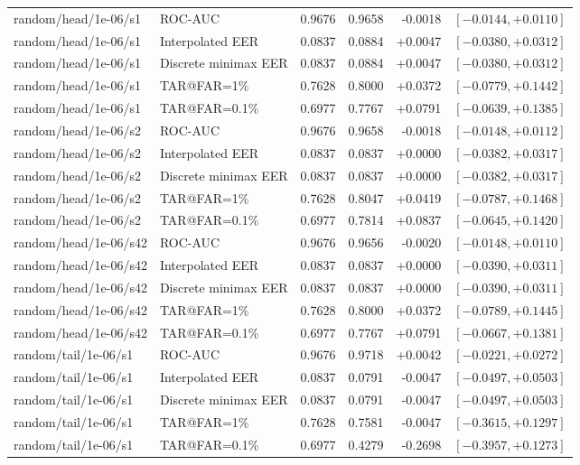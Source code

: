 \begin{table}[!t]
\begin{tabular}{@{}llrrrr@{}}
random/head/1e-06/s1 & ROC-AUC & 0.9676 & 0.9658 & -0.0018 & $[-0.0144,+0.0110]$ \\
random/head/1e-06/s1 & Interpolated EER & 0.0837 & 0.0884 & +0.0047 & $[-0.0380,+0.0312]$ \\
random/head/1e-06/s1 & Discrete minimax EER & 0.0837 & 0.0884 & +0.0047 & $[-0.0380,+0.0312]$ \\
random/head/1e-06/s1 & TAR@FAR=1\% & 0.7628 & 0.8000 & +0.0372 & $[-0.0779,+0.1442]$ \\
random/head/1e-06/s1 & TAR@FAR=0.1\% & 0.6977 & 0.7767 & +0.0791 & $[-0.0639,+0.1385]$ \\
random/head/1e-06/s2 & ROC-AUC & 0.9676 & 0.9658 & -0.0018 & $[-0.0148,+0.0112]$ \\
random/head/1e-06/s2 & Interpolated EER & 0.0837 & 0.0837 & +0.0000 & $[-0.0382,+0.0317]$ \\
random/head/1e-06/s2 & Discrete minimax EER & 0.0837 & 0.0837 & +0.0000 & $[-0.0382,+0.0317]$ \\
random/head/1e-06/s2 & TAR@FAR=1\% & 0.7628 & 0.8047 & +0.0419 & $[-0.0787,+0.1468]$ \\
random/head/1e-06/s2 & TAR@FAR=0.1\% & 0.6977 & 0.7814 & +0.0837 & $[-0.0645,+0.1420]$ \\
random/head/1e-06/s42 & ROC-AUC & 0.9676 & 0.9656 & -0.0020 & $[-0.0148,+0.0110]$ \\
random/head/1e-06/s42 & Interpolated EER & 0.0837 & 0.0837 & +0.0000 & $[-0.0390,+0.0311]$ \\
random/head/1e-06/s42 & Discrete minimax EER & 0.0837 & 0.0837 & +0.0000 & $[-0.0390,+0.0311]$ \\
random/head/1e-06/s42 & TAR@FAR=1\% & 0.7628 & 0.8000 & +0.0372 & $[-0.0789,+0.1445]$ \\
random/head/1e-06/s42 & TAR@FAR=0.1\% & 0.6977 & 0.7767 & +0.0791 & $[-0.0667,+0.1381]$ \\
random/tail/1e-06/s1 & ROC-AUC & 0.9676 & 0.9718 & +0.0042 & $[-0.0221,+0.0272]$ \\
random/tail/1e-06/s1 & Interpolated EER & 0.0837 & 0.0791 & -0.0047 & $[-0.0497,+0.0503]$ \\
random/tail/1e-06/s1 & Discrete minimax EER & 0.0837 & 0.0791 & -0.0047 & $[-0.0497,+0.0503]$ \\
random/tail/1e-06/s1 & TAR@FAR=1\% & 0.7628 & 0.7581 & -0.0047 & $[-0.3615,+0.1297]$ \\
random/tail/1e-06/s1 & TAR@FAR=0.1\% & 0.6977 & 0.4279 & -0.2698 & $[-0.3957,+0.1273]$ \\

\end{tabular}
\end{table}
